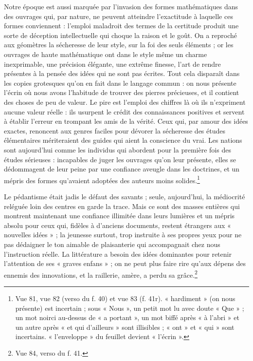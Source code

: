 \documentclass[11pt,a4paper]{article}
\begin{document}
Notre époque est aussi marquée par l'invasion des formes mathématiques dans des
ouvrages qui, par nature, ne peuvent atteindre l'exactitude à laquelle ces formes
conviennent : l'emploi maladroit des termes de la certitude produit une sorte de
déception intellectuelle qui choque la raison et le goût. On a reproché aux
géomètres la sécheresse de leur style, sur la foi des seuls éléments ; or les
ouvrages de haute mathématique ont dans le style même un charme inexprimable,
une précision élégante, une extrême finesse, l'art de rendre présentes à la
pensée des idées qui ne sont pas écrites. Tout cela disparaît dans les copies
grotesques qu'on en fait dans le langage commun : on nous présente l'écrin où
nous avons l'habitude de trouver des pierres précieuses, et il contient des
choses de peu de valeur. Le pire est l'emploi des chiffres là où ils n'expriment
aucune valeur réelle : ils usurpent le crédit des connaissances positives et
servent à établir l'erreur en trompant les amis de la vérité. Ceux qui, par
amour des idées exactes, renoncent aux genres faciles pour dévorer la sécheresse
des études élémentaires mériteraient des guides qui aient la conscience du vrai.
Les nations sont aujourd'hui comme les individus qui abordent pour la première
fois des études sérieuses : incapables de juger les ouvrages qu'on leur présente,
elles se dédommagent de leur peine par une confiance aveugle dans les doctrines,
et un mépris des formes qu'avaient adoptées des auteurs moins
solides.\footnote{Vue 81, vue 82 (verso du f. 40) et vue 83 (f. 41r).
« hardiment » (on nous présente) est incertain ; sous « Nous », un petit mot lu
avec doute « Que » ; un mot noirci au-dessus de « a portant », un mot biffé après
« à l'abri » et un autre après « et qui d'ailleurs » sont illisibles ; « ont » et
« qui » sont incertains. « l'enveloppe » du feuillet devient « l'écrin ».}

Le pédantisme était jadis le défaut des savants ; seule, aujourd'hui, la
médiocrité reléguée loin des centres en garde la trace. Mais ce sont des masses
entières qui montrent maintenant une confiance illimitée dans leurs lumières et
un mépris absolu pour ceux qui, fidèles à d'anciens documents, restent étrangers
aux « nouvelles idées » ; la jeunesse surtout, trop instruite à ses propres yeux
pour ne pas dédaigner le ton aimable de plaisanterie qui accompagnait chez nous
l'instruction réelle. La littérature a besoin des idées dominantes pour retenir
l'attention de ses « graves enfans » ; on ne peut plus faire rire qu'aux dépens
des ennemis des innovations, et la raillerie, amère, a perdu sa
grâce.\footnote{Vue 84, verso du f. 41.}
\end{document}
